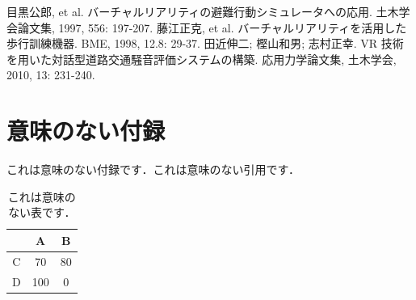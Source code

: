\documentclass[dvipdfmx]{ampbt}
\def\numberofspines{1}
\begin{document}
\begin{thebibliography}{10}
目黒公郎, et al. バーチャルリアリティの避難行動シミュレータへの応用. 土木学会論文集, 1997, 556: 197-207.
藤江正克, et al. バーチャルリアリティを活用した歩行訓練機器. BME, 1998, 12.8: 29-37.
田近伸二; 樫山和男; 志村正幸. VR 技術を用いた対話型道路交通騒音評価システムの構築. 応用力学論文集, 土木学会, 2010, 13: 231-240.
\end{thebibliography}

\appendix

\section{意味のない付録}
これは意味のない付録です．これは意味のない引用です\cite{polya1945}．

\begin{table}[htbp]
  \caption{これは意味のない表です．}
  \centering
  \begin{tabular}{c|cc}
      &  A  &  B \\
    \hline
    C &  70 & 80 \\
    D & 100 &  0
  \end{tabular}
\end{table}

\fi
\ifoutputcover
\cleardoublepage
\makecover                      %
\makespine[\numberofspines]     %
\fi
\ifoutputabstractforsubmission
\makeabstractforsubmission      %
\fi
\end{document}
